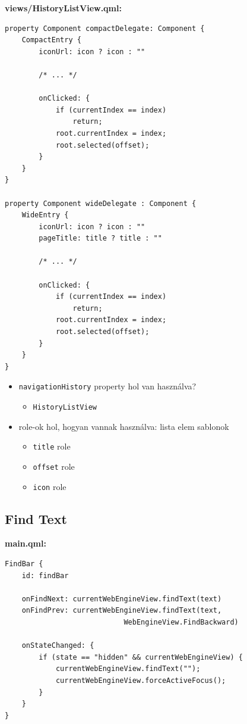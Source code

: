 \documentclass[12pt]{report}
\begin{document}
\noindent
\textbf{views/HistoryListView.qml:}
\begin{verbatim}
property Component compactDelegate: Component {
    CompactEntry {
        iconUrl: icon ? icon : ""

        /* ... */

        onClicked: {
            if (currentIndex == index)
                return;
            root.currentIndex = index;
            root.selected(offset);
        }
    }
}

property Component wideDelegate : Component {
    WideEntry {
        iconUrl: icon ? icon : ""
        pageTitle: title ? title : ""

        /* ... */

        onClicked: {
            if (currentIndex == index)
                return;
            root.currentIndex = index;
            root.selected(offset);
        }
    }
}
\end{verbatim}

\begin{itemize}
    \item \texttt{navigationHistory} property hol van használva?
        \begin{itemize}
            \item \texttt{HistoryListView}
        \end{itemize}
    \item role-ok hol, hogyan vannak használva: lista elem sablonok
        \begin{itemize}
            \item \texttt{title} role
            \item \texttt{offset} role
            \item \texttt{icon} role
        \end{itemize}
\end{itemize}

\subsection{Find Text}

\noindent
\textbf{main.qml:}
\begin{verbatim}
FindBar {
    id: findBar

    onFindNext: currentWebEngineView.findText(text)
    onFindPrev: currentWebEngineView.findText(text,
                            WebEngineView.FindBackward)

    onStateChanged: {
        if (state == "hidden" && currentWebEngineView) {
            currentWebEngineView.findText("");
            currentWebEngineView.forceActiveFocus();
        }
    }
}
\end{verbatim}
\end{document}
